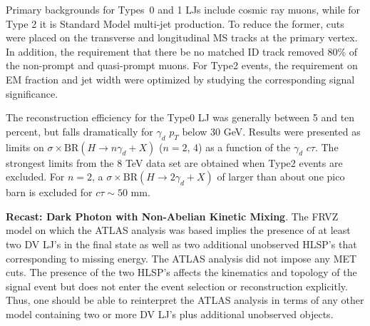 Primary backgrounds for Types~0 and 1 LJs include cosmic ray muons, while for Type 2 it is Standard Model multi-jet production. To reduce the former, cuts were placed on the transverse and longitudinal MS tracks at the primary vertex. In addition, the requirement that there be no matched ID track removed 80\% of the non-prompt and quasi-prompt muons. For Type2 events, the requirement on EM fraction and jet width were optimized by studying the corresponding signal significance. 

The reconstruction efficiency for the Type0 LJ was generally between 5 and ten percent, but falls dramatically for $\gamma_d$ $p_T$ below 30 GeV. 
%
Results were presented as limits on $\sigma\times \mathrm{BR}(H\to n\gamma_d+X)$ ($n=2$, 4) as a function of the $\gamma_d$ $c\tau$. The strongest limits  from the 8 TeV data set are obtained when Type2 events are excluded. For $n=2$, a $\sigma\times \mathrm{BR}(H\to 2\gamma_d+X)$ of larger than about one pico barn is excluded for $c\tau\sim 50$ mm. 

{\bf Recast: Dark Photon with Non-Abelian Kinetic Mixing}. The FRVZ model on which the ATLAS analysis was based implies the presence of at least two DV LJ's in the final state as well as two additional unobserved HLSP's that corresponding to missing energy. The ATLAS analysis did not impose any MET cuts. The presence of the two HLSP's affects the kinematics and topology of the signal event but does not enter the event selection or reconstruction explicitly. Thus, one should be able to reinterpret the ATLAS analysis in terms of any other model containing two or more DV LJ's plus additional unobserved objects. 

